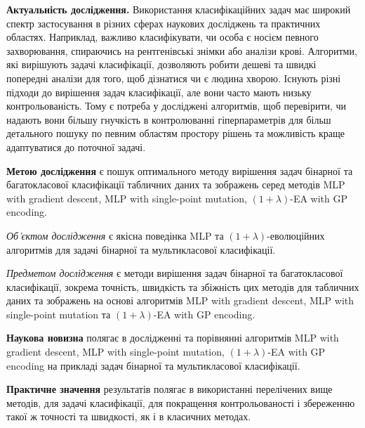 \textbf{Актуальність дослідження.} Використання класифікаційних задач має широкий спектр застосування в різних сферах наукових досліджень та практичних областях. Наприклад, важливо класифікувати, чи особа є носієм певного захворювання, спираючись на рентгенівські знімки або аналізи крові. Алгоритми, які вирішують задачі класифікації, дозволяють робити дешеві та швидкі попередні аналізи для того, щоб дізнатися чи є людина хворою. Існують різні підходи до вирішення задач класифікації, але вони часто мають низьку контрольованість. Тому є потреба у досліджені алгоритмів, щоб перевірити, чи надають вони більшу гнучкість в контролюванні гіперпараметрів для більш детального пошуку по певним областям простору рішень та можливість краще адаптуватися до поточної задачі.

\textbf{Метою дослідження} є пошук оптимального методу вирішення задач бінарної та багатокласової класифікації табличних даних та зображень серед методів MLP with gradient descent, MLP with single-point mutation, $(1+\lambda)$-EA with GP encoding.

\emph{Об'єктом дослідження} є якісна поведінка MLP та $(1+\lambda)$-еволюційних алгоритмів для задачі бінарної та мультикласової класифікації.

\emph{Предметом дослідження} є методи вирішення задач бінарної та багатокласової класифікації, зокрема точність, швидкість та збіжність цих методів для табличних даних та зображень на основі алгоритмів MLP with gradient descent, MLP with single-point mutation та $(1+\lambda)$-EA with GP encoding.

\textbf{Наукова новизна} полягає в дослідженні та порівнянні алгоритмів MLP with gradient descent, MLP with single-point mutation, $(1+\lambda)$-EA with GP encoding на прикладі задач бінарної та мультикласової класифікації.

\textbf{Практичне значення} результатів полягає в використанні перелічених вище методів, для задачі класифікації, для покращення контрольованості і збереженню такої ж точності та швидкості, як і в класичних методах.